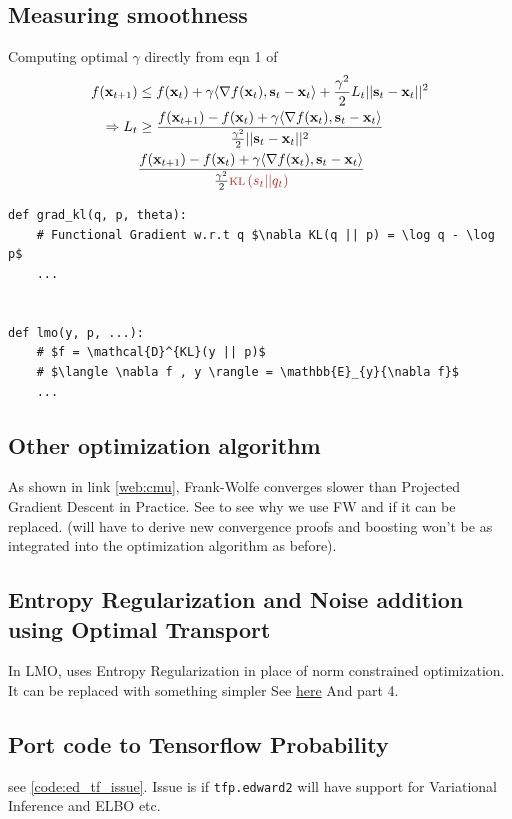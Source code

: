\documentclass[summaries.tex]{subfiles}
\begin{document}
\subsection{Measuring smoothness}
\INPROGRESS
Computing optimal $\gamma$ directly
from eqn 1 of \cite{pedregosa2018step}
\begin{align*}
  f(\bx_{t+1}) &\leq f(\bx_t) + \gamma \langle \grad f(\bx_t), \bs_t - \bx_t \rangle 
  + \frac{\gamma^2}{2}L_t ||\bs_t - \bx_t||^2 \\
  \Rightarrow L_t &\geq \frac{f(\bx_{t+1}) - f(\bx_t) 
  + \gamma \langle \grad f(\bx_t), \bs_t - \bx_t \rangle}
  {\frac{\gamma^2}{2}||\bs_t - \bx_t||^2}  \\
                  &\frac{f(\bx_{t+1}) - f(\bx_t) 
                  + \gamma \langle \grad f(\bx_t), \bs_t - \bx_t \rangle}
                  {\frac{\gamma^2}{2} \red{\kl{s_t || q_t}}}  \\
\end{align*}
\begin{verbatim}
def grad_kl(q, p, theta):
    # Functional Gradient w.r.t q $\nabla KL(q || p) = \log q - \log p$
    ...


def lmo(y, p, ...):
    # $f = \mathcal{D}^{KL}(y || p)$
    # $\langle \nabla f , y \rangle = \mathbb{E}_{y}{\nabla f}$
    ...
\end{verbatim}

\subsection{Other optimization algorithm}
\TODO
As shown in link \ref{web:cmu}, Frank-Wolfe converges slower than Projected 
Gradient Descent in Practice. See \cite{locatello2017boosting} to see why we use
FW and if it can be replaced. (will have to derive new convergence proofs and
boosting won't be as integrated into the optimization algorithm as before).

\subsection{Entropy Regularization and Noise addition using Optimal Transport}
In LMO, \cite{locatello2018boosting} uses Entropy Regularization in place of
norm constrained optimization. It can be replaced with something simpler 
See \cite{tolstikhin2017wasserstein} \cite{liu2018entropy} \cite{bernton2017inference}
\cite{jordan1998variational} \href{https://www-dimat.unipv.it/savare/Ravello2010/JKO.pdf}
{here} And \cite{peyre2017computational} part 4.

\subsection{Port code to Tensorflow Probability}
see \ref{code:ed_tf_issue}. Issue is if \texttt{tfp.edward2} will have support
for Variational Inference and ELBO etc.

\biblio
\end{document}
